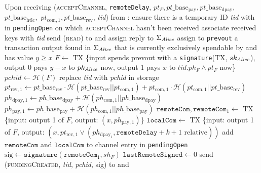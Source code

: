 \begin{algorithmic}[1]
    \State Upon receiving (\textsc{acceptChannel}, \texttt{remoteDelay}, $pt_F,
    pt\_\mathrm{base}_{\mathrm{pay}}, pt\_\mathrm{base}_{\mathrm{dpay}},$
    $pt\_\mathrm{base}_{\mathrm{htlc}},$ $pt_{\mathrm{com}, 1},
    pt\_\mathrm{base}_{\mathrm{rev}}$, \textit{tid}) from \bob:
    \Indent
      \State ensure there is a temporary ID \textit{tid} with \bob{} in
      \texttt{pendingOpen} on which \textsc{acceptChannel} hasn't been received
      \State associate received keys with \textit{tid}
      \State send (\textsc{read}) to \ledger{} and assign reply to
      $\Sigma_{\mathit{Alice}}$
      \State assign to \texttt{prevout} a transaction output found in
      $\Sigma_{\mathit{Alice}}$ that is currently exclusively spendable by \alice{} and
      has value $y \geq x$
      \State $F \gets$ TX \{input spends prevout with a \texttt{signature}(TX,
      $sk_{\mathit{Alice}}$), output 0 pays $y - x$ to $pk_{\mathit{Alice}}$ now, output 1 pays
      $x$ to $\textit{tid}.ph_F \wedge pt_F$ now\}
      \State $\mathit{pchid} \gets \mathcal{H}\left(F\right)$
      \State replace \textit{tid} with \textit{pchid} in storage
      \State $pt_{\mathrm{rev}, 1} \gets pt\_\mathrm{base}_{\mathrm{rev}} \cdot
      \mathcal{H}\left(pt\_\mathrm{base}_{\mathrm{rev}} ||
      pt_{\mathrm{com}, 1}\right) + pt_{\mathrm{com}, 1} \cdot \mathcal{H}\left(
      pt_{\mathrm{com}, 1} || pt\_\mathrm{base}_{\mathrm{rev}}\right)$
      \State $ph_{\mathrm{dpay}, 1} \gets ph\_\mathrm{base}_{\mathrm{dpay}} +
      \mathcal{H}\left(ph_{\mathrm{com}, 1} ||
      ph\_\mathrm{base}_{\mathrm{dpay}}\right)$
      \State $ph_{\mathrm{pay}, 1} \gets ph\_\mathrm{base}_{\mathrm{pay}} +
      \mathcal{H}\left(ph_{\mathrm{com}, 1} ||
      ph\_\mathrm{base}_{\mathrm{pay}}\right)$
      \State $\mathtt{remoteCom}, \mathtt{remoteCom}_1 \gets$ TX \{input: output
      1 of $F$, output: $\left(x, ph_{\mathrm{pay}, 1}\right)$\}
      \State $\mathtt{localCom} \gets$ TX \{input: output 1 of $F$, output:
      $\left(x, pt_{\mathrm{rev}, 1} \vee \left(ph_{\mathrm{dpay}_1},
      \mathtt{remoteDelay} + k + 1 \text{ relative}\right)\right)$
      \State add $\mathtt{remoteCom}$ and $\mathtt{localCom}$ to channel entry
      in \texttt{pendingOpen}
      \State $\mathrm{sig} \gets \mathtt{signature}\left(\mathtt{remoteCom}_1,
      sh_F\right)$
      \State $\mathtt{lastRemoteSigned} \gets 0$
      \State send (\textsc{fundingCreated}, \textit{tid},
      \textit{pchid}, sig) to \bob{} and \adversary
    \EndIndent
    \State


\end{algorithmic}
